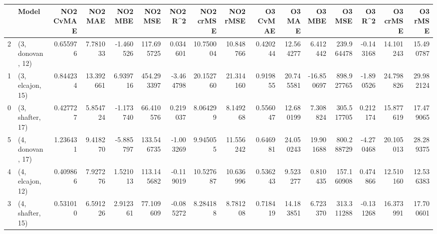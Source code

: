 \begin{tabular}{llrrrrrrrrrrrrrr}
\toprule
{} &             Model &  NO2 CvMAE &    NO2 MAE &   NO2 MBE &     NO2 MSE &   NO2 R\textasciicircum2 &  NO2 crMSE &   NO2 rMSE &  O3 CvMAE &     O3 MAE &     O3 MBE &      O3 MSE &    O3 R\textasciicircum2 &   O3 crMSE &    O3 rMSE \\
\midrule
2 &  (3, donovan, 12) &   0.655976 &   7.781033 & -1.460526 &  117.695725 &  0.034601 &  10.750004 &  10.848766 &  0.420244 &  12.564277 &   6.412442 &  239.964478 & -0.143168 &  14.101243 &  15.490787 \\
1 &  (3, elcajon, 15) &   0.844234 &  13.392661 &  6.939716 &  454.293397 & -3.464798 &  20.152760 &  21.314160 &  0.919855 &  20.745581 & -16.850697 &  898.927765 & -1.890526 &  24.798826 &  29.982124 \\
0 &  (3, shafter, 17) &   0.427727 &   5.854724 & -1.173740 &   66.410576 &  0.219037 &   8.064299 &   8.149268 &  0.556047 &  12.680199 &   7.308824 &  305.517705 &  0.212174 &  15.877619 &  17.479065 \\
5 &  (4, donovan, 17) &   1.236431 &   9.418270 & -5.885797 &  133.546735 & -1.003269 &   9.945055 &  11.556242 &  0.646981 &  24.050243 &  19.901688 &  800.288729 & -4.270468 &  20.105013 &  28.289375 \\
4 &  (4, elcajon, 12) &   0.409866 &   7.927276 &  1.521013 &  113.145682 & -0.119019 &  10.527687 &  10.636996 &  0.536243 &   9.523277 &   0.810435 &  157.160908 &  0.474866 &  12.510160 &  12.536383 \\
3 &  (4, shafter, 15) &   0.531010 &   6.591226 &  2.912361 &   77.109609 & -0.085272 &   8.284188 &   8.781208 &  0.718419 &  14.183851 &   6.723370 &  313.311288 & -0.131268 &  16.373991 &  17.700601 \\
\bottomrule
\end{tabular}
